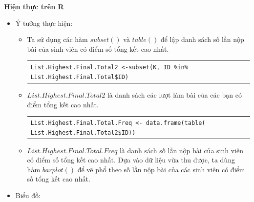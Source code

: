 \documentclass[a4paper]{article}
\theoremstyle{definition}
\begin{document}
\begin{enumerate}[a)]
\begin{itemize}
\begin{itemize}
        \end{itemize}
    \end{itemize}
    \bf Hiện thực trên R\normalfont
    \begin{itemize}
        \item Ý tưởng thực hiện:
        \begin{itemize}
            \item Ta sử dụng các hàm $subset()$ và $table()$ để lập danh sách số lần nộp bài của sinh viên có điểm số tổng kết cao nhất.
            \begin{center}
                \begin{tabular}{p{13cm}}
                    \texttt{List.Highest.Final.Total2 <-subset(K, ID \%in\% List.Highest.Final.Total\$ID)}
                \end{tabular}
            \end{center}
            \item $List.Highest.Final.Total2$ là danh sách các lượt làm bài của các bạn có điểm tổng kết cao nhất.
            \begin{center}
                \begin{tabular}{p{13cm}}
                    \texttt{List.Highest.Final.Total.Freq <- data.frame(table( List.Highest.Final.Total2\$ID))}
                \end{tabular}
            \end{center}
            \item $List.Highest.Final.Total.Freq$ là danh sách số lần nộp bài của sinh viên có điểm số tổng kết cao nhất. Dựa vào dữ liệu vừa thu được, ta dùng hàm $barplot()$ để vẽ phổ theo số lần nộp bài của các sinh viên có điểm số tổng kết cao nhất.
        \end{itemize}
        \item Biểu đồ:\\
        \begin{center}
            \begin{tabular}{c c}

\end{tabular}
\end{center}
\end{itemize}
\end{enumerate}
\end{document}
